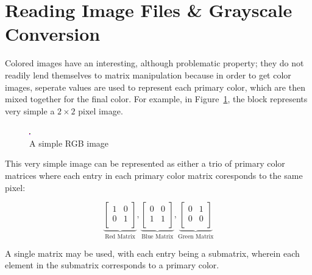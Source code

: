 \section{Reading Image Files \& Grayscale Conversion}

Colored images have an interesting, although problematic property; they do not readily lend themselves to matrix manipulation because in order to get color images, seperate values are used to represent each primary color, which are then mixed together for the final color. For example, in Figure~\ref{fig:example}, the block represents very simple a $2 \times 2$ pixel image.

    \begin{figure}[ht]
      \centering
      \includegraphics[scale=30]{./img/sqr.png}
      \caption{A simple RGB image}
      \label{fig:example}
    \end{figure}

This very simple image can be represented as either a trio of primary color matrices where each entry in each primary color matrix coresponds to the same pixel:

    \[
      \underbrace{
        \begin{bmatrix}
          1&0\\
          0&1\\
        \end{bmatrix}
      }_{\text{Red Matrix}}
      ,
      \underbrace{
        \begin{bmatrix}
          0&0\\
          1&1\\
        \end{bmatrix}
      }_{\text{Blue Matrix}}
      ,
      \underbrace{
        \begin{bmatrix}
          0&1\\
          0&0\\
        \end{bmatrix}
      }_{\text{Green Matrix}}
    \]

A single matrix may be used, with each entry being a submatrix, wherein each element in the submatrix corresponds to a primary color.

